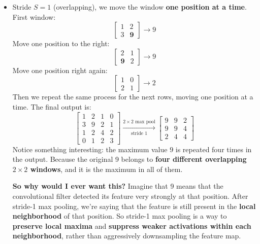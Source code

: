 \begin{examplebox}
\begin{itemize}
        \item Stride $S = 1$ (overlapping), we move the window \textbf{one position at a time}. First window:
        \begin{equation*}
            \begin{bmatrix}
                1 & 2 \\
                3 & \mathbf{9}
            \end{bmatrix} \to 9
        \end{equation*}
        Move one position to the right:
        \begin{equation*}
            \begin{bmatrix}
                2 & 1 \\
                \mathbf{9} & 2
            \end{bmatrix} \to 9
        \end{equation*}
        Move one position right again:
        \begin{equation*}
            \begin{bmatrix}
                1 & 0 \\
                2 & 1
            \end{bmatrix} \to 2
        \end{equation*}
        Then we repeat the same process for the next rows, moving one position at a time. The final output is:
        \begin{equation*}
            \begin{bmatrix}
                1 & 2 & 1 & 0 \\
                3 & 9 & 2 & 1 \\
                1 & 2 & 4 & 2 \\
                0 & 1 & 2 & 3
            \end{bmatrix}
            \xrightarrow[\text{stride 1}]{2 \times 2 \text{ max pool}}
            \begin{bmatrix}
                9 & 9 & 2 \\
                9 & 9 & 4 \\
                2 & 4 & 4
            \end{bmatrix}
        \end{equation*}
        Notice something interesting: the maximum value $9$ is repeated four times in the output. Because the original 9 belongs to \textbf{four different overlapping $2 \times 2$ windows}, and it is the maximum in all of them.

        \textcolor{Green3}{ \textbf{So why would I ever want this?}} Imagine that 9 means that the convolutional filter detected its feature very strongly at that position. After stride-1 max pooling, we're saying that the feature is still present in the \textbf{local neighborhood} of that position. So stride-1 max pooling is a way to \textbf{preserve local maxima} and \textbf{suppress weaker activations within each neighborhood}, rather than aggressively downsampling the feature map.
    \end{itemize}
\end{examplebox}

